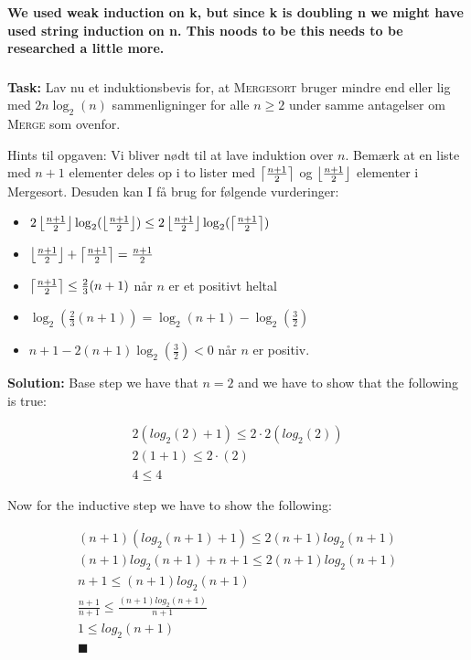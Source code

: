 \textbf{We used weak induction on k, but since k is doubling n we might have used string induction on n. This noods to be this needs to be researched a little more.}

\subsubsection{}
\textbf{Task:} Lav nu et induktionsbevis for, at \textsc{Mergesort} bruger mindre end eller lig med $2n\log_2(n)$ sammenligninger for alle $n\geq 2$ under samme antagelser om \textsc{Merge} som ovenfor. 
	
	Hints til opgaven: Vi bliver nødt til at lave induktion over $n$. Bemærk at en liste med $n+1$ elementer deles op i to lister med $\left\lceil{\frac{n+1}{2}}\right\rceil$ og $\left\lfloor{\frac{n+1}{2}}\right\rfloor$ elementer i Mergesort. Desuden kan I få brug for følgende vurderinger:
	\begin{itemize}
		\item $2\left\lfloor{\frac{n+1}{2}}\right\rfloor\log_2(\left\lfloor{\frac{n+1}{2}}\right\rfloor)\leq 2\left\lfloor{\frac{n+1}{2}}\right\rfloor\log_2(\left\lceil{\frac{n+1}{2}}\right\rceil)$
		\item $\left\lfloor{\frac{n+1}{2}}\right\rfloor+\left\lceil{\frac{n+1}{2}}\right\rceil=\frac{n+1}{2}$
		\item $\left\lceil{\frac{n+1}{2}}\right\rceil\leq \frac{2}{3}(n+1)$ når $n$ er et positivt heltal
		\item $\log_2(\frac{2}{3}(n+1))=\log_2(n+1)-\log_2(\frac{3}{2})$
		\item $n+1-2(n+1)\log_2(\frac{3}{2})<0$ når $n$ er positiv.
	\end{itemize}	 

\bigskip
\noindent
\textbf{Solution:} Base step we have that $n=2$ and we have to show that the following is true:

\begin{equation}
    \begin{aligned}
        2(log_2(2)+1)\leq2\cdot2(log_2(2))\\
        2(1+1)\leq2\cdot(2)\\
        4\leq4
    \end{aligned}
\end{equation}

\noindent
Now for the inductive step we have to show the following:

\begin{equation}
    \begin{aligned}
        (n+1)(log_2(n+1)+1)\leq2(n+1)log_2(n+1)\\
        (n+1)log_2(n+1)+n+1\leq2(n+1)log_2(n+1)\\
        n+1\leq(n+1)log_2(n+1)\\
        \frac{n+1}{n+1}\leq\frac{(n+1)log_2(n+1)}{n+1}\\
        1\leq log_2(n+1)\\
        \blacksquare
    \end{aligned}
\end{equation}


